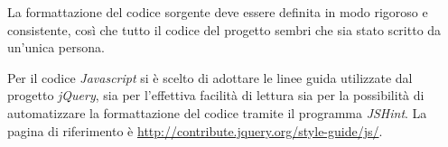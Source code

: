 La formattazione del codice sorgente deve essere definita in modo rigoroso e consistente, così che tutto il codice del progetto sembri che sia stato scritto da un'unica persona.

Per il codice \emph{Javascript} si è scelto di adottare le linee guida utilizzate dal progetto \emph{jQuery}, sia per l'effettiva facilità di lettura sia per la possibilità di automatizzare la formattazione del codice tramite il programma \emph{JSHint}. La pagina di riferimento è \url{http://contribute.jquery.org/style-guide/js/}.

